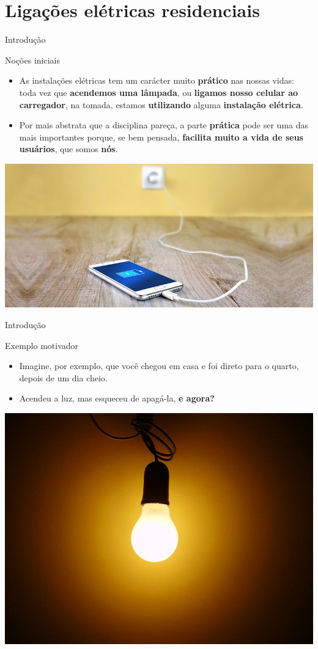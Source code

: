 \section{Ligações elétricas residenciais}

\begin{frame}{Introdução}
	\begin{block}{Noções iniciais}
		\begin{itemize}
			\item As instalações elétricas tem um carácter muito \textbf{prático} nas nossas vidas: toda vez que \textbf{acendemos uma lâmpada}, ou \textbf{ligamos nosso celular ao carregador}, na tomada, estamos \textbf{utilizando} alguma \textbf{instalação elétrica}.
			\item Por mais abstrata que a disciplina pareça, a parte \textbf{prática} pode ser uma das mais importantes porque, se bem pensada, \textbf{facilita muito a vida de seus usuários}, que somos \textbf{nós}.
		\end{itemize}
	\end{block}

	\centering
	\includegraphics[width=0.65\linewidth]{Figuras/Ch08/fig12}
\end{frame}



\begin{frame}{Introdução}
	\begin{block}{Exemplo motivador}
		\begin{itemize}
			\item Imagine, por exemplo, que você chegou em casa e foi direto para o quarto, depois de um dia cheio.
			\item Acendeu a luz, mas esqueceu de apagá-la, \textbf{e agora?}
		\end{itemize}
	\end{block}

	\centering
	\includegraphics[width=0.6\linewidth]{Figuras/Ch08/fig13}
\end{frame}


